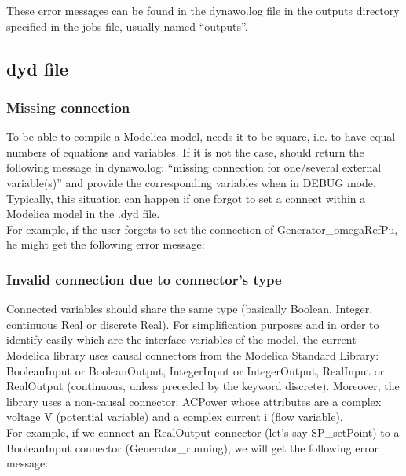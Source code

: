 \documentclass[a4paper, 12pt]{report}
\begin{document}
These error messages can be found in the dynawo.log file in the outputs directory specified in the jobs file, usually named ``outputs''.

\subsection{dyd file}

\subsubsection{Missing connection}

To be able to compile a Modelica model, \Dynawo needs it to be square, i.e. to have equal numbers of equations and variables. If it is not the case, \Dynawo should return the following message in dynawo.log: ``missing connection for one/several external variable(s)'' and provide the corresponding variables when in DEBUG mode. Typically, this situation can happen if one forgot to set a connect within a Modelica model in the .dyd file. \\

For example, if the user forgets to set the connection of Generator\_omegaRefPu, he might get the following error message:



\subsubsection{Invalid connection due to connector's type}

Connected variables should share the same type (basically Boolean, Integer, continuous Real or discrete Real). For simplification purposes and in order to identify easily which are the interface variables of the model, the current \Dynawo Modelica library uses causal connectors from the Modelica Standard Library: BooleanInput or BooleanOutput, IntegerInput or IntegerOutput, RealInput or RealOutput (continuous, unless preceded by the keyword discrete). Moreover, the library uses a non-causal connector: ACPower whose attributes are a complex voltage V (potential variable) and a complex current i (flow variable). \\

For example, if we connect an RealOutput connector (let's say SP\_setPoint) to a BooleanInput connector (Generator\_running), we will get the following error message:
\end{document}
